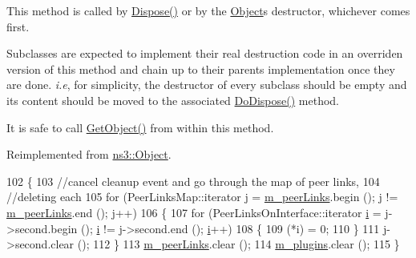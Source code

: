 This method is called by \hyperlink{classns3_1_1Object_aa90ae598863f6c251cdab3c3722afdaf}{Dispose()} or by the \hyperlink{classns3_1_1Object}{Object}\textquotesingle{}s destructor, whichever comes first.

Subclasses are expected to implement their real destruction code in an overriden version of this method and chain up to their parent\textquotesingle{}s implementation once they are done. {\itshape i.\+e}, for simplicity, the destructor of every subclass should be empty and its content should be moved to the associated \hyperlink{classns3_1_1dot11s_1_1PeerManagementProtocol_a89bc555099bee27f8218c6bc85aee2cf}{Do\+Dispose()} method.

It is safe to call \hyperlink{classns3_1_1Object_a13e18c00017096c8381eb651d5bd0783}{Get\+Object()} from within this method. 

Reimplemented from \hyperlink{classns3_1_1Object_a475d429a75d302d4775f4ae32479b287}{ns3\+::\+Object}.


\begin{DoxyCode}
102 \{
103   \textcolor{comment}{//cancel cleanup event and go through the map of peer links,}
104   \textcolor{comment}{//deleting each}
105   \textcolor{keywordflow}{for} (PeerLinksMap::iterator j = \hyperlink{classns3_1_1dot11s_1_1PeerManagementProtocol_aa4522af32720f04cfbb693adb2024c55}{m\_peerLinks}.begin (); j != 
      \hyperlink{classns3_1_1dot11s_1_1PeerManagementProtocol_aa4522af32720f04cfbb693adb2024c55}{m\_peerLinks}.end (); j++)
106     \{
107       \textcolor{keywordflow}{for} (PeerLinksOnInterface::iterator \hyperlink{bernuolliDistribution_8m_a6f6ccfcf58b31cb6412107d9d5281426}{i} = j->second.begin (); \hyperlink{bernuolliDistribution_8m_a6f6ccfcf58b31cb6412107d9d5281426}{i} != j->second.end (); 
      \hyperlink{bernuolliDistribution_8m_a6f6ccfcf58b31cb6412107d9d5281426}{i}++)
108         \{
109           (*i) = 0;
110         \}
111       j->second.clear ();
112     \}
113   \hyperlink{classns3_1_1dot11s_1_1PeerManagementProtocol_aa4522af32720f04cfbb693adb2024c55}{m\_peerLinks}.clear ();
114   \hyperlink{classns3_1_1dot11s_1_1PeerManagementProtocol_a9000d20f6feb3db279a020b237f49d64}{m\_plugins}.clear ();
115 \}
\end{DoxyCode}
